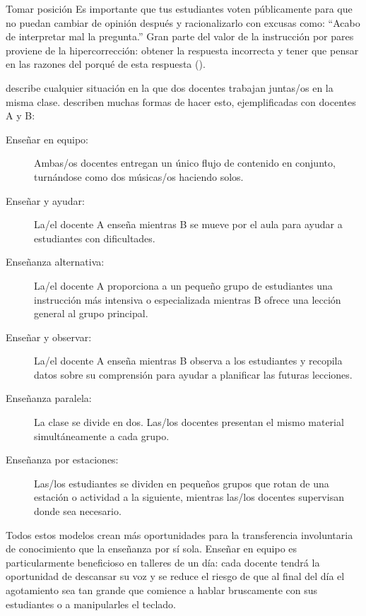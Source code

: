 \begin{aside}{Tomar posición}
  Es importante que tus estudiantes voten públicamente
  para que no puedan cambiar de opinión después y racionalizarlo
  con excusas como: ``Acabo de interpretar mal la pregunta.''
  Gran parte del valor de la instrucción por pares proviene de la hipercorrección:
  obtener la respuesta incorrecta
  y tener que pensar en las razones del porqué de esta respuesta
  ().
\end{aside}


 describe cualquier situación
en la que dos docentes trabajan juntas/os en la misma clase.
\cite{Frie2016} describen muchas formas de hacer esto, ejemplificadas con docentes A y B:

\begin{description}

\item[Enseñar en equipo:]
  Ambas/os docentes entregan un único flujo de contenido en conjunto,
  turnándose como dos músicas/os haciendo solos.

\item[Enseñar y ayudar:]
  La/el docente A enseña mientras B se mueve por el aula
  para ayudar a estudiantes con dificultades.

\item[Enseñanza alternativa:]
  La/el docente A proporciona a un pequeño grupo de estudiantes
  una instrucción más intensiva o especializada
  mientras B ofrece una lección general al grupo principal.
 
\item[Enseñar y observar:]
  La/el docente A enseña mientras B observa a los estudiantes
  y recopila datos sobre su comprensión para ayudar a planificar las futuras lecciones.

\item[Enseñanza paralela:]
  La clase se divide en dos. 
  Las/los docentes presentan el mismo material simultáneamente a cada grupo.

\item[Enseñanza por estaciones:]
  Las/los estudiantes se dividen en pequeños grupos
  que rotan de una estación o actividad a la siguiente,
  mientras las/los docentes supervisan donde sea necesario.

\end{description}

Todos estos modelos crean más oportunidades para la transferencia involuntaria de conocimiento que la enseñanza por sí sola.
Enseñar en equipo es particularmente beneficioso en talleres de un día:
cada docente tendrá la oportunidad de descansar su voz
y se reduce el riesgo de que al final del día el agotamiento sea tan grande
que comience a hablar bruscamente con sus estudiantes
o a manipularles el teclado.

